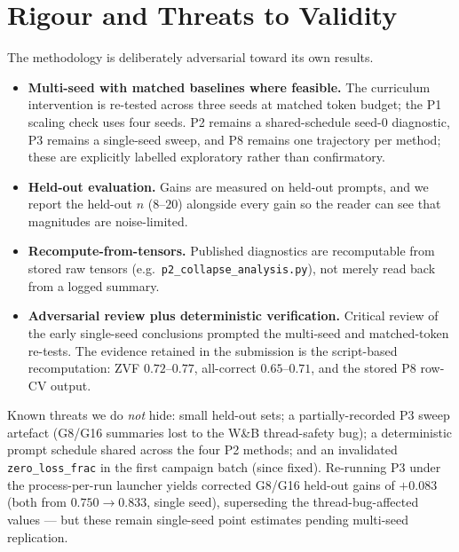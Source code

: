\section{Rigour and Threats to Validity}
\label{sec:rigor}
The methodology is deliberately adversarial toward its own results.
\begin{itemize}[leftmargin=1.4em,itemsep=2pt]
  \item \textbf{Multi-seed with matched baselines where feasible.} The curriculum
  intervention is re-tested across three seeds at matched token budget; the P1
  scaling check uses four seeds. P2 remains a shared-schedule seed-0 diagnostic, P3
  remains a single-seed sweep, and P8 remains one trajectory per method; these are
  explicitly labelled exploratory rather than confirmatory.
  \item \textbf{Held-out evaluation.} Gains are measured on held-out prompts, and we
  report the held-out $n$ ($8$--$20$) alongside every gain so the reader can see that
  magnitudes are noise-limited.
  \item \textbf{Recompute-from-tensors.} Published diagnostics are recomputable from
  stored raw tensors (e.g.\ \texttt{p2\_collapse\_analysis.py}), not merely read back
  from a logged summary.
  \item \textbf{Adversarial review plus deterministic verification.} Critical review
  of the early single-seed conclusions prompted the multi-seed and matched-token
  re-tests. The evidence retained in the submission is the script-based recomputation:
  ZVF $0.72$--$0.77$, all-correct $0.65$--$0.71$, and the stored P8 row-CV output.
\end{itemize}
Known threats we do \emph{not} hide: small held-out sets; a partially-recorded P3
sweep artefact (G8/G16 summaries lost to the W\&B thread-safety bug); a deterministic
prompt schedule shared across the four P2 methods; and an invalidated
\texttt{zero\_loss\_frac} in the first campaign batch (since fixed). Re-running P3
under the process-per-run launcher yields corrected G8/G16 held-out gains of
$+0.083$ (both from $0.750\to0.833$, single seed), superseding the thread-bug-affected
values --- but these remain single-seed point estimates pending multi-seed
replication.

